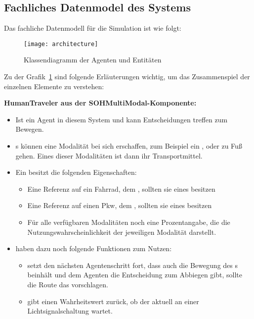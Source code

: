 %

\subsection{Fachliches Datenmodel des Systems}\label{subsec:data-model}

Das fachliche Datenmodell für die Simulation ist wie folgt:

\begin{figure}[h]
    \centering
    \texttt{[image: architecture]}
    \caption{Klassendiagramm der Agenten und Entitäten}
    \label{fig:class-diagramm}
\end{figure}

Zu der Grafik~\ref{fig:class-diagramm} sind folgende Erläuterungen wichtig, um das Zusammenspiel der einzelnen Elemente zu verstehen:

\textbf{HumanTraveler aus der SOHMultiModal-Komponente:}
\begin{itemize}
    \item Ist ein Agent in diesem System und kann Entscheidungen treffen zum Bewegen.
    \item {}s können eine Modalität bei sich erschaffen, zum Beispiel ein ,  oder zu Fuß gehen.
    Eines dieser Modalitäten ist dann ihr Transportmittel.
    \item Ein  besitzt die folgenden Eigenschaften:
    \begin{itemize}
        \item Eine Referenz auf ein Fahrrad, dem , sollten sie eines besitzen
        \item Eine Referenz auf einen Pkw, dem , sollten sie eines besitzen
        \item Für alle verfügbaren Modalitäten noch eine Prozentangabe, die die Nutzungswahrscheinlichkeit der jeweiligen Modalität darstellt.
    \end{itemize}
    \item {} haben dazu noch folgende Funktionen zum Nutzen:
    \begin{itemize}
        \item {} setzt den nächsten Agentenschritt fort, dass auch die Bewegung des s beinhält und dem Agenten die Entscheidung zum Abbiegen gibt, sollte die Route das vorschlagen.
        \item {} gibt einen Wahrheitswert zurück, ob der  aktuell an einer Lichtsignalschaltung wartet.
    \end{itemize}
\end{itemize}

